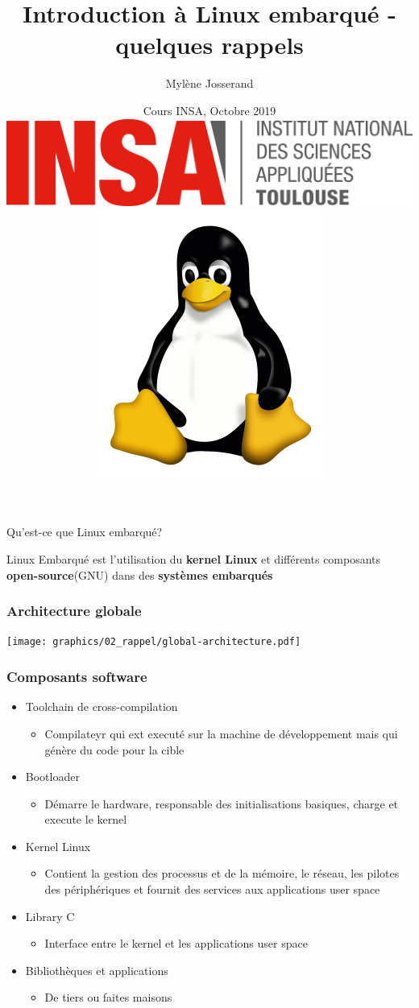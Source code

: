 \documentclass[aspectratio=169,obeyspaces,spaces,hyphens,dvipsnames]{beamer}
\title{Introduction à Linux embarqué - quelques rappels}
\author[Mylène Josserand]
{Mylène Josserand}
\date[Octobre 2019]
{Cours INSA, Octobre 2019 \\
  \vspace{0.5cm}
  \includegraphics[scale=0.1]{pictures/insa-tls.png}
  \hspace{0.5cm}
  \includegraphics[scale=0.1]{pictures/tux.png}
}
\institute[]
{Développeuse et formatrice Linux embarqué}
\begin{document}
\begin{frame}
  \titlepage
\end{frame}

\begin{frame}{Qu'est-ce que Linux embarqué?}
  \huge
  \begin{center}
    Linux Embarqué est l'utilisation du {\bf kernel Linux} et différents
    composants {\bf open-source}(GNU) dans des {\bf systèmes embarqués}
  \end{center}
\end{frame}

\begin{frame}
  \frametitle{Architecture globale}
  \begin{center}
    \texttt{[image: graphics/02\_rappel/global-architecture.pdf]}
  \end{center}
\end{frame}

\begin{frame}
  \frametitle{Composants software}
  \begin{itemize}
  \item Toolchain de cross-compilation
    \begin{itemize}
    \item Compilateyr qui ext executé sur la machine de développement
      mais qui génère du code pour la cible
    \end{itemize}
  \item Bootloader
    \begin{itemize}
    \item Démarre le hardware, responsable des initialisations basiques,
      charge et execute le kernel
    \end{itemize}
  \item Kernel Linux
    \begin{itemize}
    \item Contient la gestion des processus et de la mémoire, le réseau, les
      pilotes des périphériques et fournit des services aux applications
      user space
    \end{itemize}
  \item Library C
    \begin{itemize}
    \item Interface entre le kernel et les applications user space
    \end{itemize}
  \item Bibliothèques et applications
    \begin{itemize}
    \item De tiers ou faites maisons
    \end{itemize}
  \end{itemize}
\end{frame}
\end{document}
